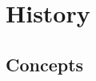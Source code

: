 \chapter{History}
\label{chap:history}

\lipsum[1-2]

\minitoc

\newpage

\section{Concepts}

\lipsum[1-2]
